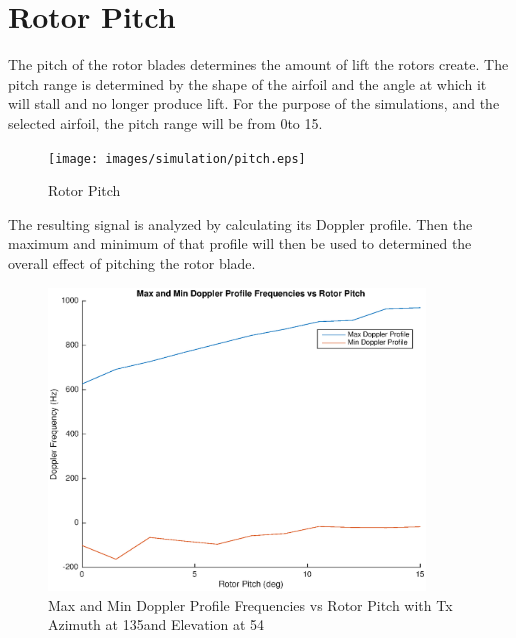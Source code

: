 \section{Rotor Pitch}
The pitch of the rotor blades determines the amount of lift the rotors create. The pitch range is determined by the shape of the airfoil and the angle at which it will stall and no longer produce lift. For the purpose of the simulations, and the selected airfoil, the pitch range will be from 0\textdegree  \space to 15\textdegree.

\begin{figure}
	\begin{center}
		\texttt{[image: images/simulation/pitch.eps]}
		\caption{Rotor Pitch}
		\label{fig:blade_pitch}
	\end{center}
\end{figure}

The resulting signal is analyzed by calculating its Doppler profile. Then the maximum and minimum of that profile will then be used to determined the overall effect of pitching the rotor blade. 

\begin{figure}
	\begin{center}
		\includegraphics[width=10cm]{images/simulation/pitch_max_doppler.eps}
		\caption{Max and Min Doppler Profile Frequencies vs Rotor Pitch with Tx Azimuth at 135\textdegree \space and Elevation at 54\textdegree}
		\label{fig:pitch_15_135deg}
	\end{center}
\end{figure}


